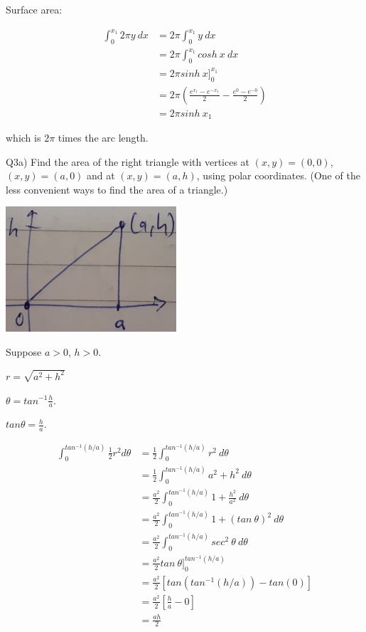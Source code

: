 \documentclass[9pt]{article}
\begin{document}
Surface area:

\begin{align*}
  \int_0^{x_1} 2 \pi y \ dx &= 2 \pi \int_0^{x_1} y \ dx \\
  &= 2 \pi \int_0^{x_1} cosh \ x \ dx \\
  &= 2 \pi sinh \ x \bigg]_0^{x_1} \\
  &= 2 \pi (\frac{e^{x_1} - e^{-x_1}}{2} - \frac{e^0 - e^{-0}}{2}) \\
  &= 2 \pi sinh \ x_1
\end{align*}

which is $2\pi$ times the arc length.


\begin{tcolorbox}
  Q3a) Find the area of the right triangle with vertices at $(x, y) = (0, 0)$, $(x, y) = (a, 0)$ and at $(x, y) = (a, h)$, using polar coordinates. (One of the less convenient ways to find the area of a triangle.)
\end{tcolorbox}

\begin{center}
  \includegraphics[scale=0.8]{3a.jpg}
\end{center}

Suppose $a > 0$, $h > 0$.

$r = \sqrt{a^2 + h^2}$

$\theta = tan^{-1} \frac{h}{a}$.

$tan \theta = \frac{h}{a}$.

\begin{align*}
  \int_{0}^{tan^{-1}(h/a)} \frac{1}{2} r^2 d \theta &= \frac{1}{2} \int_{0}^{tan^{-1}(h/a)} r^2 \ d \theta \\
  &= \frac{1}{2} \int_{0}^{tan^{-1}(h/a)} a^2 + h^2 \ d \theta \\
  &= \frac{a^2}{2} \int_{0}^{tan^{-1}(h/a)} 1 + \frac{h^2}{a^2} \ d \theta \\
  &= \frac{a^2}{2} \int_{0}^{tan^{-1}(h/a)} 1 + (tan \ \theta)^2 \ d \theta \\
  &= \frac{a^2}{2} \int_{0}^{tan^{-1}(h/a)} sec^2 \ \theta \ d \theta \\
  &= \frac{a^2}{2} tan \ \theta \bigg]_{0}^{tan^{-1}(h/a)} \\
  &= \frac{a^2}{2} [tan(tan^{-1}(h/a)) - tan(0)] \\
  &= \frac{a^2}{2} [\frac{h}{a} - 0] \\
  &= \frac{ah}{2}
\end{align*}
\end{document}
